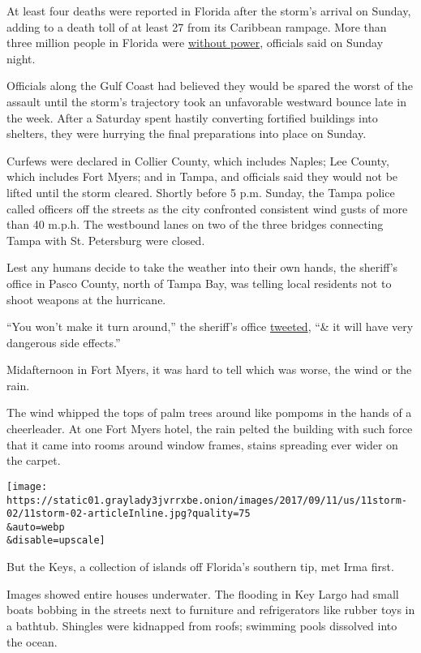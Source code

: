 At least four deaths were reported in Florida after the storm's arrival
on Sunday, adding to a death toll of at least 27 from its Caribbean
rampage. More than three million people in Florida were
\href{https://www.fpl.com/storm/customer-outages.html}{without power},
officials said on Sunday night.

Officials along the Gulf Coast had believed they would be spared the
worst of the assault until the storm's trajectory took an unfavorable
westward bounce late in the week. After a Saturday spent hastily
converting fortified buildings into shelters, they were hurrying the
final preparations into place on Sunday.

Curfews were declared in Collier County, which includes Naples; Lee
County, which includes Fort Myers; and in Tampa, and officials said they
would not be lifted until the storm cleared. Shortly before 5 p.m.
Sunday, the Tampa police called officers off the streets as the city
confronted consistent wind gusts of more than 40 m.p.h. The westbound
lanes on two of the three bridges connecting Tampa with St. Petersburg
were closed.

Lest any humans decide to take the weather into their own hands, the
sheriff's office in Pasco County, north of Tampa Bay, was telling local
residents not to shoot weapons at the hurricane.

``You won't make it turn around,'' the sheriff's office
\href{https://twitter.com/PascoSheriff/status/906712903868469249}{tweeted},
``\& it will have very dangerous side effects.''

Midafternoon in Fort Myers, it was hard to tell which was worse, the
wind or the rain.

The wind whipped the tops of palm trees around like pompoms in the hands
of a cheerleader. At one Fort Myers hotel, the rain pelted the building
with such force that it came into rooms around window frames, stains
spreading ever wider on the carpet.

\texttt{[image: https://static01.graylady3jvrrxbe.onion/images/2017/09/11/us/11storm-02/11storm-02-articleInline.jpg?quality=75\\\&auto=webp\\\&disable=upscale]}

But the Keys, a collection of islands off Florida's southern tip, met
Irma first.

Images showed entire houses underwater. The flooding in Key Largo had
small boats bobbing in the streets next to furniture and refrigerators
like rubber toys in a bathtub. Shingles were kidnapped from roofs;
swimming pools dissolved into the ocean.

